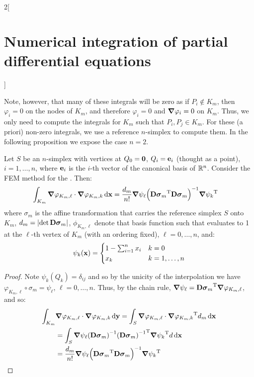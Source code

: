 \documentclass[../../../main_math.tex]{subfiles}
\begin{document}
\begin{multicols}{2}[\section{Numerical integration of partial differential equations}]
\begin{remark}
$$    $$
    Note, however, that many of these integrals will be zero as if $P_i\notin K_m$, then $\varphi_i=0$ on the nodes of $K_m$, and therefore $\varphi_i=0$ and $\grad{\varphi_i}=0$ on $K_m$. Thus, we only need to compute the integrals for $K_m$ such that $P_i, P_j\in K_m$. For these (a priori) non-zero integrals, we use a reference $n$-simplex to compute them. In the following proposition we expose the case $n=2$.
  \end{remark}
  \begin{proposition}
    Let $S$ be an $n$-simplex with vertices at $Q_0=\boldsymbol{\mathrm{0}}$, $Q_i=\boldsymbol{\mathrm{e}}_i$ (thought as a point), $i=1,\ldots,n$, where $\boldsymbol{\mathrm{e}}_i$ is the $i$-th vector of the canonical basis of $\mathbb{R}^n$. Consider the FEM method for the . Then:
    \begin{align*}
      \int_{K_m}\grad\varphi_{K_m,\ell}\cdot \grad\varphi_{K_m,k}\dd{\boldsymbol{\mathrm{x}}} & =\frac{d_m}{n!}{\grad\psi_\ell}{\left({\boldsymbol{\mathrm{D\sigma}}_m}^{\mathrm{T}}\boldsymbol{\mathrm{D\sigma}}_m\right)}^{-1}{\grad\psi_k}^{\mathrm{T}}
    \end{align*}
    where $\sigma_m$ is the affine transformation that carries the reference simplex $S$ onto $K_m$, $d_m=\abs{\det\boldsymbol{\mathrm{D\sigma}}_m}$, $\phi_{K_m,\ell}$ denote that basis function such that evaluates to 1 at the $\ell$-th vertex of $K_m$ (with an ordering fixed), $\ell =0,\ldots,n$, and:
    $$
      \psi_k(\boldsymbol{\mathrm{x}})=\begin{cases}
        1-\sum_{i=1}^n x_i & k=0          \\
        x_k                & k=1,\ldots,n
      \end{cases}
    $$
  \end{proposition}
  \begin{proof}
    Note $\psi_k(Q_k)=\delta_{ij}$ and so by the unicity of the interpolation we have $\varphi_{K_m,\ell}\circ \sigma_m=\psi_\ell$, $\ell=0,\ldots,n$. Thus, by the chain rule, $\grad\psi_\ell={\boldsymbol{\mathrm{D\sigma}}_m}^{\mathrm{T}}\grad\varphi_{K_m,\ell}$, and so:
    \begin{align*}
      \int_{K_m} & \grad\varphi_{K_m,\ell}\cdot \grad\varphi_{K_m,k}\dd{\vf{y}}  =\int_S\grad\varphi_{K_m,\ell}\cdot \transpose{\grad\varphi_{K_m,k}}d_m\dd{\vf{x}} \\
                 & =\int_S\grad\psi_\ell{\left(\vf{D\sigma}_m\right)}^{-1}\transpose{{\left(\vf{D\sigma}_m\right)}^{-1}}\transpose{\grad\psi_k}d\dd{\vf{x}}         \\
                 & =\frac{d_m}{n!}\grad\psi_\ell{\left(\transpose{\vf{D\sigma}_m}\vf{D\sigma}_m\right)}^{-1}\transpose{\grad\psi_k}

\end{align*}
\end{proof}
\end{multicols}
\end{document}
